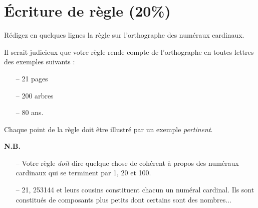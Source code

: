 \documentclass[a4paper,11pt]{article}
\begin{document}
\section{\textbf{Écriture de règle} (20\%)}
\noindent
Rédigez en quelques lignes la règle sur l'orthographe des numéraux cardinaux.
\smallskip	

\noindent
Il serait judicieux que votre règle rende compte de l'orthographe en toutes lettres des exemples suivants :
\begin{itemize}
\item[--] 21 pages
\item[--] 200 arbres
\item[--] 80 ans.
\end{itemize}

\noindent
Chaque point de la règle doit être illustré par un exemple \emph{pertinent}.
\smallskip	

\noindent
\textbf{N.B.}
\begin{itemize}
\item [--] Votre règle \emph{doit} dire quelque chose de cohérent à propos des numéraux cardinaux qui se terminent par 1, 20 et 100.
\item [--] 21, 253144 et leurs cousins constituent chacun un numéral cardinal. Ils sont constitués de composants plus petits dont certains sont des nombres...
\end{itemize}
\end{document}
